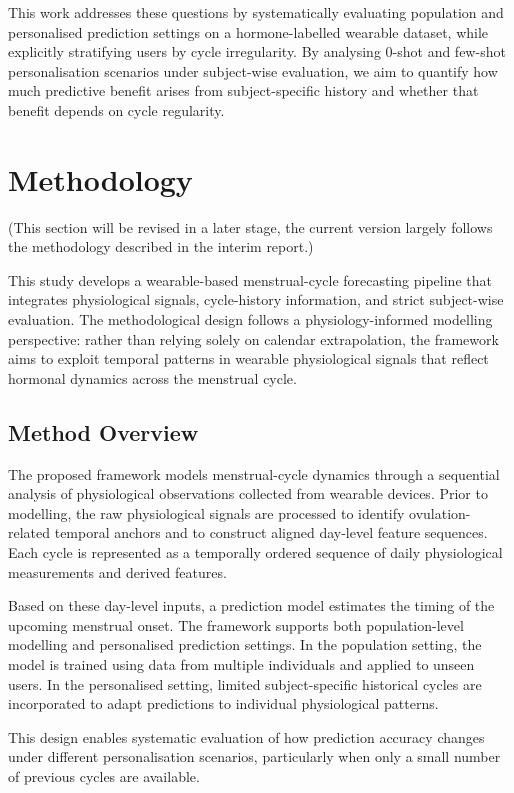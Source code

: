 \documentclass[conference]{IEEEtran}
\begin{document}
This work addresses these questions by systematically evaluating population and personalised prediction settings on a hormone-labelled wearable dataset, while explicitly stratifying users by cycle irregularity. By analysing 0-shot and few-shot personalisation scenarios under subject-wise evaluation, we aim to quantify how much predictive benefit arises from subject-specific history and whether that benefit depends on cycle regularity.
\section{Methodology}

(This section will be revised in a later stage, the current version largely follows the methodology described in the interim report.)

This study develops a wearable-based menstrual-cycle forecasting pipeline that integrates physiological signals, cycle-history information, and strict subject-wise evaluation. The methodological design follows a physiology-informed modelling perspective: rather than relying solely on calendar extrapolation, the framework aims to exploit temporal patterns in wearable physiological signals that reflect hormonal dynamics across the menstrual cycle.

\subsection{Method Overview}

The proposed framework models menstrual-cycle dynamics through a sequential analysis of physiological observations collected from wearable devices. Prior to modelling, the raw physiological signals are processed to identify ovulation-related temporal anchors and to construct aligned day-level feature sequences. Each cycle is represented as a temporally ordered sequence of daily physiological measurements and derived features.

Based on these day-level inputs, a prediction model estimates the timing of the upcoming menstrual onset. The framework supports both population-level modelling and personalised prediction settings. In the population setting, the model is trained using data from multiple individuals and applied to unseen users. In the personalised setting, limited subject-specific historical cycles are incorporated to adapt predictions to individual physiological patterns.

This design enables systematic evaluation of how prediction accuracy changes under different personalisation scenarios, particularly when only a small number of previous cycles are available.
\end{document}
